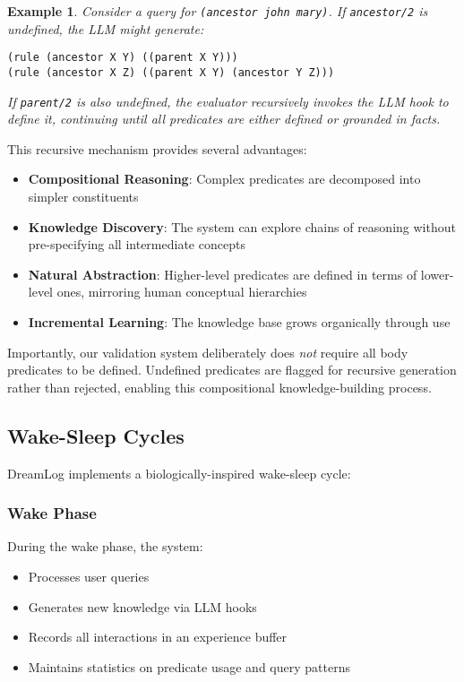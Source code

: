 \documentclass[10pt,conference]{IEEEtran}
\newtheorem{example}[theorem]{Example}
\begin{document}
\begin{example}
Consider a query for \texttt{(ancestor john mary)}. If \texttt{ancestor/2} is undefined, the LLM might generate:
\begin{lstlisting}
(rule (ancestor X Y) ((parent X Y)))
(rule (ancestor X Z) ((parent X Y) (ancestor Y Z)))
\end{lstlisting}

If \texttt{parent/2} is also undefined, the evaluator recursively invokes the LLM hook to define it, continuing until all predicates are either defined or grounded in facts.
\end{example}

This recursive mechanism provides several advantages:
\begin{itemize}
\item \textbf{Compositional Reasoning}: Complex predicates are decomposed into simpler constituents
\item \textbf{Knowledge Discovery}: The system can explore chains of reasoning without pre-specifying all intermediate concepts
\item \textbf{Natural Abstraction}: Higher-level predicates are defined in terms of lower-level ones, mirroring human conceptual hierarchies
\item \textbf{Incremental Learning}: The knowledge base grows organically through use
\end{itemize}

Importantly, our validation system deliberately does \textit{not} require all body predicates to be defined. Undefined predicates are flagged for recursive generation rather than rejected, enabling this compositional knowledge-building process.

\subsection{Wake-Sleep Cycles}

DreamLog implements a biologically-inspired wake-sleep cycle:

\subsubsection{Wake Phase}
During the wake phase, the system:
\begin{itemize}
\item Processes user queries
\item Generates new knowledge via LLM hooks
\item Records all interactions in an experience buffer
\item Maintains statistics on predicate usage and query patterns
\end{itemize}
\end{document}
